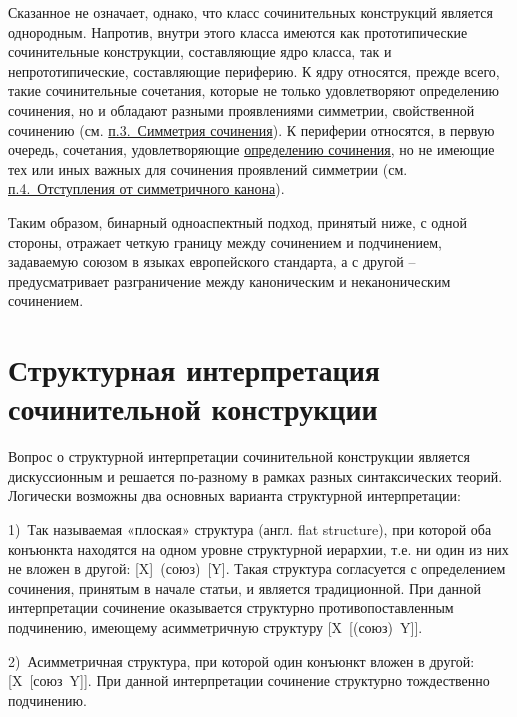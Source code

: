 Сказанное не означает, однако, что класс сочинительных конструкций
является однородным. Напротив, внутри этого класса имеются как
прототипические сочинительные конструкции, составляющие ядро класса, так
и непрототипические, составляющие периферию. К ядру относятся, прежде
всего, такие сочинительные сочетания, которые не только удовлетворяют
определению сочинения, но и обладают разными проявлениями симметрии,
свойственной сочинению (см. \underline{п.3.~Симметрия сочинения}). К
периферии относятся, в первую очередь, сочетания, удовлетворяющие
\underline{определению сочинения}, но не имеющие тех или иных важных для
сочинения проявлений симметрии (см. \underline{п.4.~Отступления от
симметричного канона}).

Таким образом, бинарный одноаспектный подход, принятый ниже, с одной
стороны, отражает четкую границу между сочинением и подчинением,
задаваемую союзом в языках европейского стандарта, а с другой --
предусматривает разграничение между каноническим и неканоническим
сочинением.

\hypertarget{ux441ux442ux440ux443ux43aux442ux443ux440ux43dux430ux44f-ux438ux43dux442ux435ux440ux43fux440ux435ux442ux430ux446ux438ux44f-ux441ux43eux447ux438ux43dux438ux442ux435ux43bux44cux43dux43eux439-ux43aux43eux43dux441ux442ux440ux443ux43aux446ux438ux438}{%
\section{Структурная интерпретация сочинительной
конструкции}\label{ux441ux442ux440ux443ux43aux442ux443ux440ux43dux430ux44f-ux438ux43dux442ux435ux440ux43fux440ux435ux442ux430ux446ux438ux44f-ux441ux43eux447ux438ux43dux438ux442ux435ux43bux44cux43dux43eux439-ux43aux43eux43dux441ux442ux440ux443ux43aux446ux438ux438}}

Вопрос о структурной интерпретации сочинительной конструкции является
дискуссионным и решается по-разному в рамках разных синтаксических
теорий. Логически возможны два основных варианта структурной
интерпретации:

1)~Так называемая «плоская» структура (англ. flat structure), при
которой оба конъюнкта находятся на одном уровне структурной иерархии,
т.е. ни один из них не вложен в другой: {[}X{]}~(союз)~{[}Y{]}. Такая
структура согласуется с определением сочинения, принятым в начале
статьи, и является традиционной. При данной интерпретации сочинение
оказывается структурно противопоставленным подчинению, имеющему
асимметричную структуру {[}X~{[}(союз)~Y{]}{]}.

2)~Асимметричная структура, при которой один конъюнкт вложен в другой:
{[}X~{[}союз~Y{]}{]}. При данной интерпретации сочинение структурно
тождественно подчинению.

